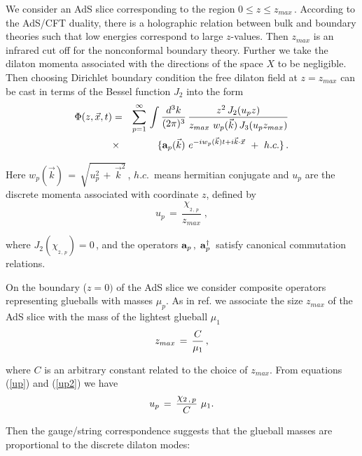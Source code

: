 \documentclass[a4paper,twocolumn,prl,groupedaddress,nofootinbib,showpacs]{revtex4}
\begin{document}
We consider an AdS slice corresponding to the region
$0 \le z \le z_{max}\,$.
According to the AdS/CFT duality, there is a holographic relation 
between bulk and boundary theories such that low energies 
correspond to large $z$-values. Then $z_{max} $ is an infrared cut 
off for the nonconformal boundary theory. 
Further we take the dilaton momenta associated with the directions of 
the space $X$ to be negligible.
Then choosing Dirichlet boundary condition the free dilaton field at 
$ z = z_{max}$ can be cast in terms of the Bessel function $J_2$ 
into the form \cite{BB1}
\begin{eqnarray}
\label{QF}
\Phi(z,\vec x,t) &=& \sum_{p=1}^\infty \,
\int { d^3 k \over (2\pi)^{3}}\,
{z^{2} \,J_2 (u_p z ) \over z_{max}\,\, w_p(\vec k ) 
\,J_{3} (u_p z_{max} ) }\nonumber\\
&\times& \lbrace { {\bf a}_p(\vec k )\ }
 e^{-iw_p(\vec k ) t +i\vec k \cdot \vec x}\,
\,+\,\,h.c.\rbrace\,.
\end{eqnarray}

\noindent 
Here $w_p(\vec k ) \,=\,\sqrt{ u_p^2\,+\,{\vec k}^2}\,$, $h.c.\,$ 
means hermitian conjugate and  $u_p$ are the discrete momenta  
associated with coordinate $z$,  defined by 
\begin{equation}
\label{up}
u_p \,=\,\frac{ \chi_{_{2\,,\,p}}}{z_{max}}\;,
\end{equation}

\noindent where $ J_2 (\chi_{_{2\,,\,p}} )=0\,$, and the operators 
${\bf a}_p\, ,\;{\bf a}^{\dagger}_p \,$ satisfy canonical 
commutation relations.
 
 On the boundary ($ z = 0)$ of the AdS slice we consider composite 
operators representing glueballs with masses $\mu_p$. 
As in ref. \cite{PS} we associate the size $z_{max}$ of the AdS slice 
with the mass of the lightest glueball  $\mu_1$  
\begin{equation}
\label{up2}
z_{max} \,=\, { C \over \mu_1}\,,
\end{equation}
 

\noindent where $C$ is an arbitrary constant related to the choice of  
$z_{max}$. From equations (\ref{up}) and (\ref{up2}) we have 
\begin{equation}
\label{up3}
u_p \,=\,{\chi_{2\,,\,p}\over C} \,\, \mu_1 .
\end{equation} 


Then the gauge/string correspondence suggests that the glueball masses
are proportional to the discrete dilaton modes: 
\end{document}

